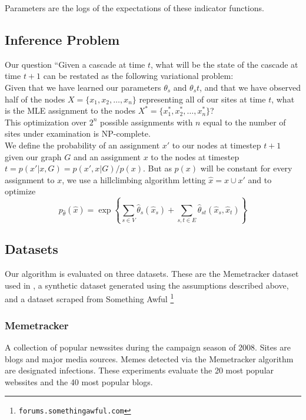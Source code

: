 \documentclass{article} %
\begin{document}
Parameters are the logs of the expectations of these indicator functions.


\subsection{Inference Problem}
Our question “Given a cascade at time $t$, what will be the state of the cascade at time $t+1$ can be restated as the following variational problem:\\
Given that we have learned our parameters $\theta_s$ and $\theta_st$, and that we have observed half of the nodes $X=\{x_1 ,x_2,\dots,x_n\}$ representing all of our sites at time $t$, what is the MLE assignment to the nodes $X^*=\{x^*_1 ,x^*_2,\dots,x^*_n\}$?\\
This optimization over $2^n$ possible assignments with $n$ equal to the number of sites under examination is NP-complete.\\

We define the probability of an assignment $x'$ to our nodes at timestep $t+1$ given our graph $G$ and an assignment $x$ to the nodes at timestep $t  
=
p(x'|x,G)=p(x',x|G)/p(x)
$. But as $p(x)$ will be constant for every assignment to $x$, we use a hillclimbing algorithm letting
 $\hat{x}=x\cup x'$ and to optimize 
  $$p_{\hat{\theta}}(\hat{x})
  =\exp \left\{ \sum_{s\in V}\hat{\theta}_s(\hat{x}_s)+\sum_{s,t\in E}\hat{\theta}_{st}(\hat{x}_s,\hat{x}_t)\right\} $$


\subsection{Datasets}
\label{data}

Our algorithm is evaluated on three datasets. These are the Memetracker dataset used in \cite{memetracker}, a synthetic dataset generated using the assumptions described above, and a dataset scraped from Something Awful \footnote{\texttt{forums.somethingawful.com}}

\subsubsection{Memetracker}

A collection of popular newssites during the campaign season of 2008. Sites are blogs and major media sources. Memes detected via the Memetracker algorithm \cite{memetracker} are designated infections. These experiments evaluate the 20 most popular webssites and the 40 most popular blogs.
\end{document}
